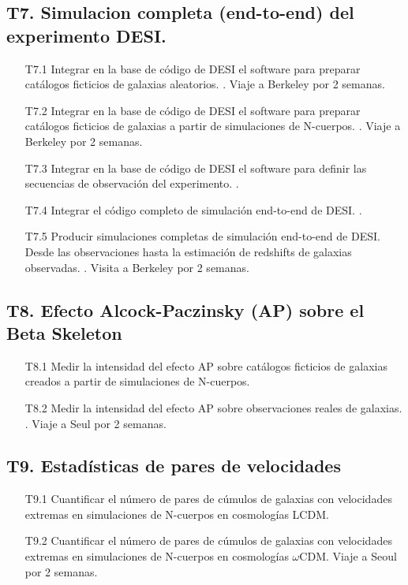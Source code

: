 \subsection*{T7. Simulacion completa (end-to-end) del experimento DESI.}
\begin{itemize}
\item[T7.1] \prof Integrar en la base de c\'odigo de DESI el software para
  preparar cat\'alogos ficticios de galaxias aleatorios. \bob. Viaje a Berkeley por 2 semanas. 
\item[T7.2] \gradA\prof Integrar en la base de c\'odigo de DESI el software para
  preparar cat\'alogos ficticios de galaxias a partir de simulaciones
  de N-cuerpos. \bob. Viaje a Berkeley por 2 semanas.
\item[T7.3] \prof Integrar en la base de c\'odigo de DESI el software para
  definir las secuencias de observaci\'on del experimento. \bob.
\item[T7.4] \prof Integrar el c\'odigo completo de simulaci\'on end-to-end
  de DESI. \bob. 
\item[T7.5] \prof Producir simulaciones completas de simulaci\'on end-to-end
  de DESI. Desde las observaciones hasta la estimaci\'on de redshifts
  de galaxias observadas. \bob. Visita a Berkeley por 2 semanas.
\end{itemize}

\subsection*{T8. Efecto Alcock-Paczinsky (AP) sobre el Beta Skeleton}
\begin{itemize}
\item[T8.1] \gradB Medir la intensidad del efecto AP sobre cat\'alogos
  ficticios de galaxias creados a partir de simulaciones de N-cuerpos.\park
\item[T8.2] \prof Medir la intensidad del efecto AP sobre observaciones
  reales de galaxias. \park. Viaje a Seul por 2 semanas.
\end{itemize}

\subsection*{T9. Estad\'isticas de pares de velocidades}
\begin{itemize}
\item[T9.1] \gradB\prof Cuantificar el n\'umero de pares de c\'umulos de galaxias
  con velocidades extremas en simulaciones de N-cuerpos en
  cosmolog\'ias LCDM. 
\item[T9.2] \gradB Cuantificar el n\'umero de pares de c\'umulos de galaxias con velocidades extremas en simulaciones de N-cuerpos en
  cosmolog\'ias $\omega$CDM. Viaje a Seoul por 2 semanas.
\end{itemize}

